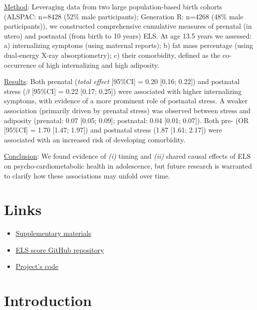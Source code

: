 \documentclass[
  letterpaper,
  DIV=11,
  numbers=noendperiod]{scrreport}
\providecommand{\tightlist}{%
  \setlength{\itemsep}{0pt}\setlength{\parskip}{0pt}}\usepackage{longtable,booktabs,array}
\begin{document}
\ul{Method}: Leveraging data from two large population-based birth
cohorts (ALSPAC: n=8428 (52\% male participants); Generation R: n=4268
(48\% male participants)), we constructed comprehensive cumulative
measures of prenatal (in utero) and postnatal (from birth to 10 years)
ELS. At age 13.5 years we assessed: a) internalizing symptoms (using
maternal reports); b) fat mass percentage (using dual-energy X-ray
absorptiometry); c) their comorbidity, defined as the co-occurrence of
high internalizing and high adiposity.

\ul{Results}: Both prenatal (\emph{total effect} {[}95\%CI{]} = 0.20
{[}0.16; 0.22{]}) and postnatal stress (\(\beta\) {[}95\%CI{]} = 0.22
{[}0.17; 0.25{]}) were associated with higher internalizing symptoms,
with evidence of a more prominent role of postnatal stress. A weaker
association (primarily driven by prenatal stress) was observed between
stress and adiposity (prenatal: 0.07 {[}0.05; 0.09{]}; postnatal: 0.04
{[}0.01; 0.07{]}). Both pre- (OR {[}95\%CI{]} = 1.70 {[}1.47; 1.97{]})
and postnatal stress (1.87 {[}1.61; 2.17{]}) were associated with an
increased risk of developing comorbidity.

\ul{Conclusion}: We found evidence of \emph{(i)} timing and \emph{(ii)}
shared causal effects of ELS on psycho-cardiometabolic health in
adolescence, but future research is warranted to clarify how these
associations may unfold over time.

\newpage

\section*{Links}\label{links}


\begin{itemize}
\tightlist
\item
  \href{__suppl_general__}{Supplementary materials}
\item
  \href{__els_repo__}{ELS score GitHub repository}
\item
  \href{__project_repo__}{Project's code}
\end{itemize}

\newpage

\section{Introduction}\label{introduction}
\end{document}
